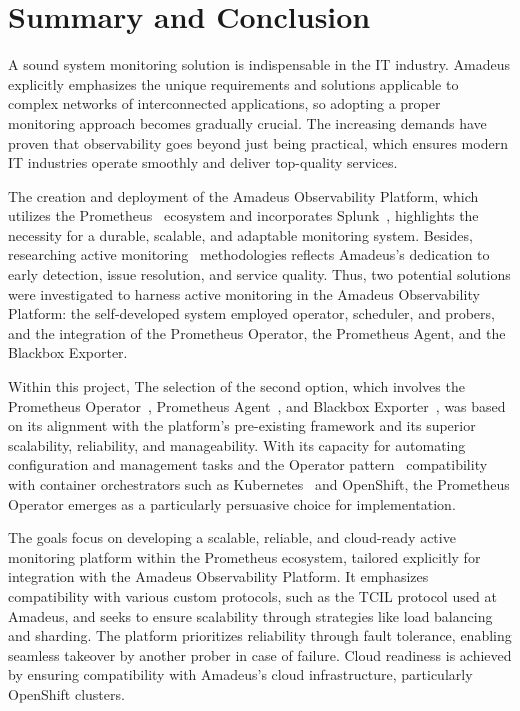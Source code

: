 
\chapter{Summary and Conclusion}\label{chapter:summary_and_conclusion}

A sound system monitoring solution is indispensable in the IT industry. Amadeus explicitly emphasizes the unique requirements and solutions applicable to complex networks of interconnected applications, so adopting a proper monitoring approach becomes gradually crucial. The increasing demands have proven that observability goes beyond just being practical, which ensures modern IT industries operate smoothly and deliver top-quality services. 

The creation and deployment of the Amadeus Observability Platform, which utilizes the Prometheus~\parencite{PrometheusMonitoringSystem} ecosystem and incorporates Splunk~\parencite{SplunkKeyEnterprise}, highlights the necessity for a durable, scalable, and adaptable monitoring system. Besides, researching active monitoring~\parencite{parkTechnologyTrendsChallenges2023} methodologies reflects Amadeus's dedication to early detection, issue resolution, and service quality. Thus, two potential solutions were investigated to harness active monitoring in the Amadeus Observability Platform: the self-developed system employed operator, scheduler, and probers, and the integration of the Prometheus Operator, the Prometheus Agent, and the Blackbox Exporter. 

Within this project, The selection of the second option, which involves the Prometheus Operator~\parencite{PrometheusOperator}, Prometheus Agent~\parencite{PrometheusAgentSupport}, and Blackbox Exporter~\parencite{BlackboxExporter}, was based on its alignment with the platform's pre-existing framework and its superior scalability, reliability, and manageability. With its capacity for automating configuration and management tasks and the Operator pattern~\parencite{OperatorPattern} compatibility with container orchestrators such as Kubernetes~\parencite{ProductionGradeContainerOrchestration} and OpenShift, the Prometheus Operator emerges as a particularly persuasive choice for implementation. 

The goals focus on developing a scalable, reliable, and cloud-ready active monitoring platform within the Prometheus ecosystem, tailored explicitly for integration with the Amadeus Observability Platform. It emphasizes compatibility with various custom protocols, such as the \ac{TCIL} protocol used at Amadeus, and seeks to ensure scalability through strategies like load balancing and sharding. The platform prioritizes reliability through fault tolerance, enabling seamless takeover by another prober in case of failure. Cloud readiness is achieved by ensuring compatibility with Amadeus's cloud infrastructure, particularly OpenShift clusters. 

